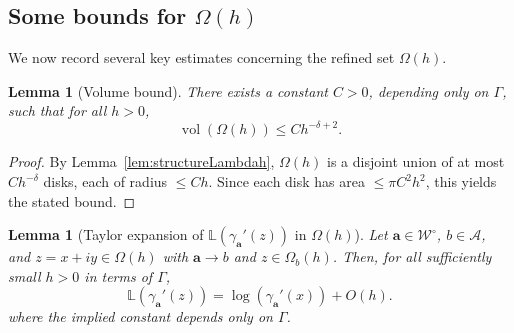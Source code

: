 \documentclass[12pt,letterpaper]{amsart}
\theoremstyle{plain}
\newtheorem{lemma}[prop]{Lemma}
\theoremstyle{definition}
\theoremstyle{remark}
\newcommand{\Aa}{\textbf{a}}
\DeclareMathOperator{\vol}{vol}
\begin{document}
\subsection{Some bounds for $\Omega(h)$}\label{sec:boundsForOmega}
We now record several key estimates concerning the refined set $\Omega(h)$.

\begin{lemma}[Volume bound]\label{lem:vol}
There exists a constant $C > 0$, depending only on $\Gamma$, such that for all $h > 0$, 
\[
\vol(\Omega(h)) \le C h^{-\delta + 2}.
\]
\end{lemma}

\begin{proof}
By Lemma~\ref{lem:structureLambdah}, $\Omega(h)$ is a disjoint union of at most $C h^{-\delta}$ disks, each of radius $\le C h$. Since each disk has area $\le \pi C^2 h^2$, this yields the stated bound.
\end{proof}

\begin{lemma}[Taylor expansion of $\mathbb{L}(\gamma_{\Aa}'(z))$ in $\Omega(h)$]\label{lem:taylor}
Let $\Aa \in \mathcal{W}^\circ$, $b \in \mathcal{A}$, and $z = x + i y \in \Omega(h)$ with $\Aa \to b$ and $z \in \Omega_b(h)$. Then, for all sufficiently small $h > 0$ in terms of $\Gamma$,
\[
\mathbb{L}(\gamma_{\Aa}'(z)) = \log(\gamma_{\Aa}'(x))  + O(h).
\]
where the implied constant depends only on $\Gamma$.
\end{lemma}
\end{document}
